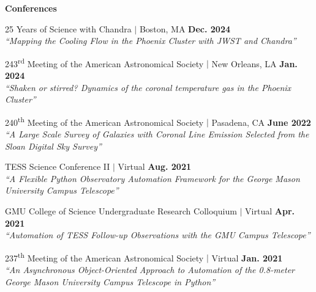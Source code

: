 \documentclass[marg, centered]{res}
\begin{document}
\begin{resume}
\begin{talks}[itemindent=0pt, leftmargin=19pt]
\end{talks}

\textbf{Conferences}

\begin{talks}[itemindent=0pt, leftmargin=19pt]

\item[{\sc [\href{https://cxc.cfa.harvard.edu/cdo/symposium_2024/schedule.html#talk}{\color{dkbu} \texttt{C}}]}] 25 Years of Science with Chandra $|$ Boston, MA \hfill \textbf{Dec. 2024} \\
\textit{``Mapping the Cooling Flow in the Phoenix Cluster with JWST and Chandra''} 

\item[{\sc [\href{https://ui.adsabs.harvard.edu/abs/2024AAS...24344204R/abstract}{\color{dkbu} \texttt{C}}]}] 243\textsuperscript{rd} Meeting of the American Astronomical Society $|$ New Orleans, LA \hfill \textbf{Jan. 2024} \\
\textit{``Shaken or stirred? Dynamics of the coronal temperature gas in the Phoenix Cluster''} 
    
\item[{\sc [\href{https://ui.adsabs.harvard.edu/abs/2022AAS...24010113R/abstract}{\color{dkbu} \texttt{P}}]}] 240\textsuperscript{th} Meeting of the American Astronomical Society $|$ Pasadena, CA \hfill \textbf{June 2022} \\
\textit{``A Large Scale Survey of Galaxies with Coronal Line Emission Selected from the Sloan Digital Sky Survey''}

\item[{\sc [\href{https://zenodo.org/records/5114171}{\color{dkbu} \texttt{P}}]} ] TESS Science Conference II $|$ Virtual \hfill \textbf{Aug. 2021}\\
\textit{``A Flexible Python Observatory Automation Framework for the George Mason University Campus Telescope''}

\item[{\sc [\texttt{P}]}] GMU College of Science Undergraduate Research Colloquium $|$ Virtual \hfill \textbf{Apr. 2021}\\
\textit{``Automation of TESS Follow-up Observations with the GMU Campus Telescope''}

\item[{\sc [\href{https://ui.adsabs.harvard.edu/abs/2021AAS...23734407R/abstract}{\color{dkbu} \texttt{P}}]}] 237\textsuperscript{th} Meeting of the American Astronomical Society $|$ Virtual \hfill \textbf{Jan. 2021}\\
\textit{``An Asynchronous Object-Oriented Approach to Automation of the 0.8-meter George Mason University Campus Telescope in Python''}


\end{talks}
\end{resume}
\end{document}
